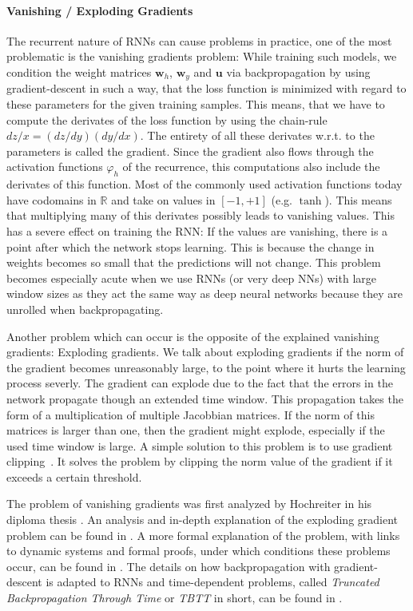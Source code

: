 \paragraph{Vanishing / Exploding Gradients} The recurrent nature of RNNs can cause problems in practice, one of the most problematic is the vanishing gradients problem: While training such models, we condition the weight matrices $\mathbf{w}_h$, $\mathbf{w}_y$ and $\mathbf{u}$ via backpropagation by using gradient-descent in such a way, that the loss function is minimized with regard to these parameters for the given training samples. This means, that we have to compute the derivates of the loss function by using the chain-rule $dz/x = (dz/dy)(dy/dx)$. The entirety of all these derivates w.r.t. to the parameters is called the gradient. Since the gradient also flows through the activation functions $\varphi_h$ of the recurrence, this computations also include the derivates of this function. Most of the commonly used activation functions today have codomains in $\mathbb{R}$ and take on values in $[-1, +1]$ (e.g. $\operatorname{tanh}$). This means that multiplying many of this derivates possibly leads to vanishing values. This has a severe effect on training the RNN: If the values are vanishing, there is a point after which the network stops learning. This is because the change in weights becomes so small that the predictions will not change. This problem becomes especially acute when we use RNNs (or very deep NNs) with large window sizes as they act the same way as deep neural networks because they are unrolled when backpropagating.

Another problem which can occur is the opposite of the explained vanishing gradients: Exploding gradients. We talk about exploding gradients if the norm of the gradient becomes unreasonably large, to the point where it hurts the learning process severly. The gradient can explode due to the fact that the errors in the network propagate though an extended time window. This propagation takes the form of a multiplication of multiple Jacobbian matrices. If the norm of this matrices is larger than one, then the gradient might explode, especially if the used time window is large. A simple solution to this problem is to use gradient clipping~\cite{Pascanu:2013}. It solves the problem by clipping the norm value of the gradient if it exceeds a certain threshold.

The problem of vanishing gradients was first analyzed by Hochreiter in his diploma thesis \cite{Hochreiter:1991}. An analysis and in-depth explanation of the exploding gradient problem can be found in \cite{Pascanu:2012}. A more formal explanation of the problem, with links to dynamic systems and formal proofs, under which conditions these problems occur, can be found in \cite{Pascanu:2013}. The details on how backpropagation with gradient-descent is adapted to RNNs and time-dependent problems, called \emph{Truncated Backpropagation Through Time} or \emph{TBTT} in short, can be found in \cite{Werbos:1990}.

